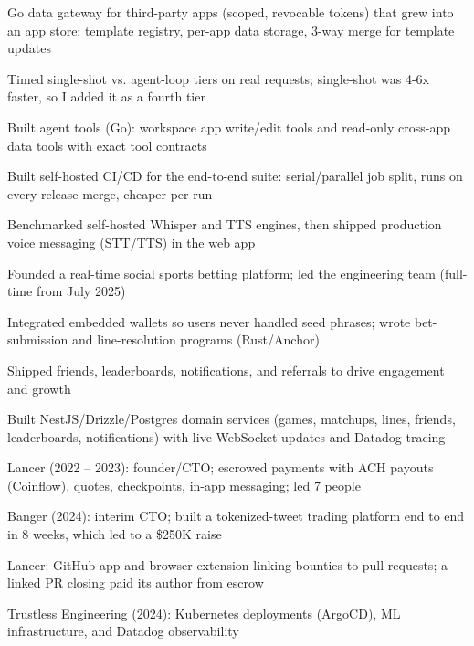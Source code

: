 \documentclass[print]{jack-resume}
\begin{document}
\begin{tightemize}
    \item Go data gateway for third-party apps (scoped, revocable tokens) that grew into an app store: template registry, per-app data storage, 3-way merge for template updates
    \item Timed single-shot vs. agent-loop tiers on real requests; single-shot was 4-6x faster, so I added it as a fourth tier
    \item Built agent tools (Go): workspace app write/edit tools and read-only cross-app data tools with exact tool contracts
    \item Built self-hosted CI/CD for the end-to-end suite: serial/parallel job split, runs on every release merge, cheaper per run
    \item Benchmarked self-hosted Whisper and TTS engines, then shipped production voice messaging (STT/TTS) in the web app
\end{tightemize}
\sectionsep

\begin{tightemize}
    \item Founded a real-time social sports betting platform; led the engineering team (full-time from July 2025)
    \item Integrated embedded wallets so users never handled seed phrases; wrote bet-submission and line-resolution programs (Rust/Anchor)
    \item Shipped friends, leaderboards, notifications, and referrals to drive engagement and growth
    \item Built NestJS/Drizzle/Postgres domain services (games, matchups, lines, friends, leaderboards, notifications) with live WebSocket updates and Datadog tracing
\end{tightemize}
\sectionsep

\begin{tightemize}
    \item Lancer (2022 -- 2023): founder/CTO; escrowed payments with ACH payouts (Coinflow), quotes, checkpoints, in-app messaging; led 7 people
    \item Banger (2024): interim CTO; built a tokenized-tweet trading platform end to end in 8 weeks, which led to a \$250K raise
    \item Lancer: GitHub app and browser extension linking bounties to pull requests; a linked PR closing paid its author from escrow
    \item Trustless Engineering (2024): Kubernetes deployments (ArgoCD), ML infrastructure, and Datadog observability
\end{tightemize}
\sectionsep
\end{document}

